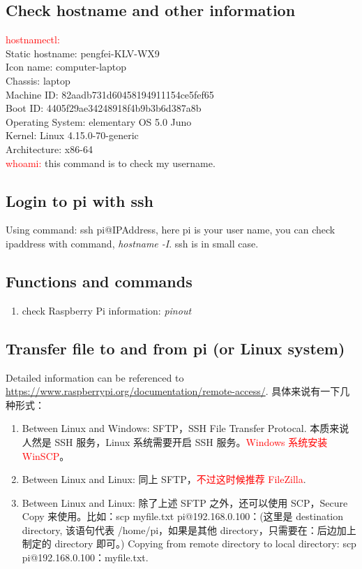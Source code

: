 \documentclass[UTF8,fancyhdr,a4paper]{ctexart}
\begin{document}
\subsection{Check hostname and other information}
\textcolor{red}{hostnamectl:}\\
Static hostname: pengfei-KLV-WX9\\
Icon name: computer-laptop\\
Chassis: laptop\\
Machine ID: 82aadb731d60458194911154ce5fef65\\
Boot ID: 4405f29ae34248918f4b9b3b6d387a8b\\
Operating System: elementary OS 5.0 Juno\\
Kernel: Linux 4.15.0-70-generic\\
Architecture: x86-64\\
\textcolor{red}{whoami:} this command is to check my username.
\subsection{Login to pi with ssh}
Using command: ssh pi@IPAddress, here pi is your user name, you can check ipaddress with command, \textit{hostname -I}. ssh is in small case.
\subsection{Functions and commands}
\begin{enumerate}
      \item check Raspberry Pi information: \textit{pinout}
\end{enumerate}
\subsection{Transfer file to and from pi (or Linux system)}
Detailed information can be referenced to \url{https://www.raspberrypi.org/documentation/remote-access/}. 具体来说有一下几种形式：
\begin{enumerate}
      \item Between Linux and Windows: SFTP，SSH File Transfer Protocal. 本质来说人然是 SSH 服务，Linux 系统需要开启 SSH 服务。\textcolor{red}{Windows 系统安装 WinSCP}。
      \item Between Linux and Linux: 同上 SFTP，\textcolor{red}{不过这时候推荐 FileZilla}.
      \item Between Linux and Linux: 除了上述 SFTP 之外，还可以使用 SCP，Secure Copy 来使用。比如：scp myfile.txt pi@192.168.0.100：(这里是 destination directory, 该语句代表 /home/pi，如果是其他 directory，只需要在：后边加上制定的 directory 即可。) Copying from remote directory to local directory: scp pi@192.168.0.100：myfile.txt.
\end{enumerate}
\end{document}
